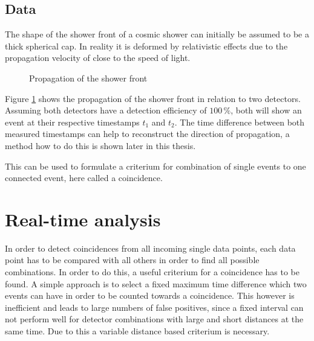 \documentclass[abstract,toc,los,english,10pt,glossary,acronyms]{jluthesis}
\begin{document}
\subsection{Data}
The shape of the shower front of a cosmic shower can initially be assumed to be a thick spherical cap. In reality it is deformed by relativistic effects due to the propagation velocity of close to the speed of light.
\begin{figure}[ht!]
	\centering
	\caption{Propagation of the shower front}
	\label{fig:data-shape}
\end{figure}
Figure \ref{fig:data-shape} shows the propagation of the shower front in relation to two detectors. Assuming both detectors have a detection efficiency of $100\,\%$, both will show an event at their respective timestamps $t_1$ and $t_2$. The time difference between both measured timestamps can help to reconstruct the direction of propagation, a method how to do this is shown later in this thesis.

This can be used to formulate a criterium for combination of single events to one connected event, here called a coincidence.
\section{Real-time analysis}
In order to detect coincidences from all incoming single data points, each data point has to be compared with all others in order to find all possible combinations. In order to do this, a useful criterium for a coincidence has to be found. A simple approach is to select a fixed maximum time difference which two events can have in order to be counted towards a coincidence. This however is inefficient and leads to large numbers of false positives, since a fixed interval can not perform well for detector combinations with large and short distances at the same time. Due to this a variable distance based criterium is necessary.
\end{document}
